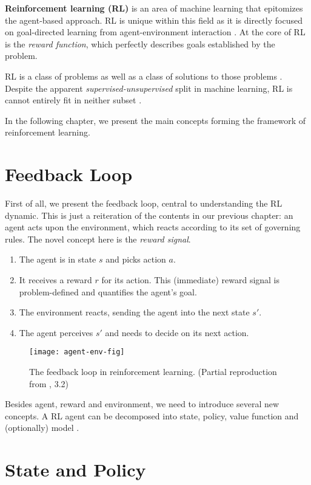 \textbf{Reinforcement learning (RL)} is an area of machine learning that epitomizes the agent-based approach.
RL is unique within this field as it is directly focused on goal-directed learning from agent-environment interaction \cite{rlai}.
At the core of RL is the \emph{reward function}, which perfectly describes goals established by the problem.

RL is a class of problems as well as a class of solutions to those problems \cite{rlai}.
Despite the apparent \emph{supervised-unsupervised} split in machine learning, RL is cannot entirely fit in neither subset \cite{rlai}.

In the following chapter, we present the main concepts forming the framework of reinforcement learning.

\section{Feedback Loop}
First of all, we present the feedback loop, central to understanding the RL dynamic.
This is just a reiteration of the contents in our previous chapter:
an agent acts upon the environment, which reacts according to its set of governing rules.
The novel concept here is the \emph{reward signal}.
\begin{enumerate}
    \item The agent is in state \(s\) and picks action \(a\).
    \item It receives a reward \(r\) for its action. This (immediate) reward signal is problem-defined and quantifies the agent’s goal.
    \item The environment reacts, sending the agent into the next state \(s'\).
    \item The agent perceives \(s'\) and needs to decide on its next action.
\end{enumerate}

\begin{figure}[ht]
    \caption{The feedback loop in reinforcement learning. (Partial reproduction from \cite{rlai}, 3.2)}
    \centering
    \vspace*{0.5cm}
    \texttt{[image: agent-env-fig]}
\end{figure}

Besides agent, reward and environment, we need to introduce several new concepts. A RL agent can be decomposed into state, policy, value function and (optionally) model \cite{rlai}.

\section{State and Policy}

